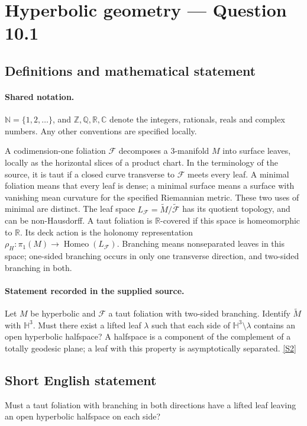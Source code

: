 \documentclass[11pt]{article}
\newcommand{\sref}[2]{\hyperlink{source:#1:#2}{[S#2]}}
\begin{document}
\section{Hyperbolic geometry — Question 10.1}\label{statement}

\subsection{Definitions and mathematical statement}

\paragraph{Shared notation.}$\mathbb N=\{1,2,\ldots\}$, and $\mathbb Z,\mathbb Q,\mathbb R,\mathbb C$ denote the integers, rationals, reals and complex numbers. Any other conventions are specified locally.


A codimension-one foliation $\mathcal F$ decomposes a $3$-manifold $M$ into surface leaves, locally as the horizontal slices of a product chart. In the terminology of the source, it is taut if a closed curve transverse to $\mathcal F$ meets every leaf. A minimal foliation means that every leaf is dense; a minimal surface means a surface with vanishing mean curvature for the specified Riemannian metric. These two uses of minimal are distinct. The leaf space $L_{\mathcal F}=\widetilde M/\widetilde{\mathcal F}$ has its quotient topology, and can be non-Hausdorff. A taut foliation is $\mathbb R$-covered if this space is homeomorphic to $\mathbb R$. Its deck action is the holonomy representation $\rho_H:\pi_1(M)\longrightarrow\operatorname{Homeo}(L_{\mathcal F})$. Branching means nonseparated leaves in this space; one-sided branching occurs in only one transverse direction, and two-sided branching in both.
\paragraph{Statement recorded in the supplied source.}
Let $M$ be hyperbolic and $\mathcal F$ a taut foliation with two-sided branching. Identify $\widetilde M$ with $\mathbb H^3$. Must there exist a lifted leaf $\lambda$ such that each side of $\mathbb H^3\setminus\lambda$ contains an open hyperbolic halfspace? A halfspace is a component of the complement of a totally geodesic plane; a leaf with this property is asymptotically separated. \sref{statement}{2}
\subsection{Short English statement}
Must a taut foliation with branching in both directions have a lifted leaf leaving an open hyperbolic halfspace on each side?
\end{document}
